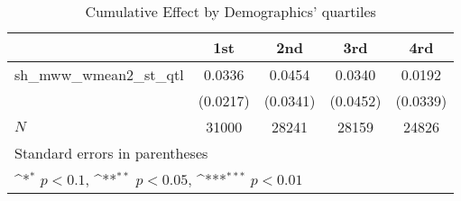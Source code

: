 \begin{table}[htbp]\centering
\def\sym#1{\ifmmode^{#1}\else\(^{#1}\)\fi}
\caption{Cumulative Effect by Demographics' quartiles}
\begin{tabular}{l*{4}{c}}
\hline\hline
            &\multicolumn{1}{c}{1st}&\multicolumn{1}{c}{2nd}&\multicolumn{1}{c}{3rd}&\multicolumn{1}{c}{4rd}\\
\hline
sh\_mww\_wmean2\_st\_qtl&      0.0336         &      0.0454         &      0.0340         &      0.0192         \\
            &    (0.0217)         &    (0.0341)         &    (0.0452)         &    (0.0339)         \\
\hline
\(N\)       &       31000         &       28241         &       28159         &       24826         \\
\hline\hline
\multicolumn{5}{l}{\footnotesize Standard errors in parentheses}\\
\multicolumn{5}{l}{\footnotesize \sym{*} \(p<0.1\), \sym{**} \(p<0.05\), \sym{***} \(p<0.01\)}\\
\end{tabular}
\end{table}
